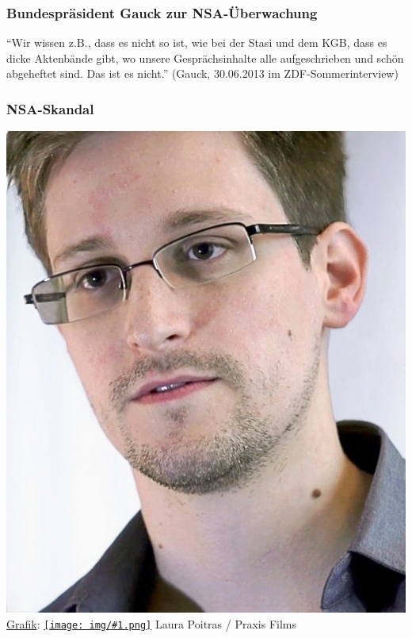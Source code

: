 \documentclass[12pt]{beamer}
\newcommand{\cc}[1]{\texttt{[image: img/\#1.png]}\hspace{1mm}}
\begin{document}
\begin{frame}
    \frametitle{Bundespräsident Gauck zur NSA-Überwachung}
    \begin{center}
      ``Wir wissen z.B., dass es nicht so ist, wie bei der Stasi und dem KGB, dass es dicke Aktenbände gibt, wo unsere Gesprächsinhalte alle aufgeschrieben und schön abgeheftet sind. Das ist es nicht.''
      (Gauck, 30.06.2013 im ZDF-Sommerinterview)
    \end{center}
\end{frame}

\begin{frame}
    \frametitle{NSA-Skandal}
    \begin{center}
	\includegraphics[height=0.7\textheight]{img/snowden.jpg}
	\\{\small \href{https://commons.wikimedia.org/wiki/File:Edward_Snowden.jpg\#mediaviewer/File:Edward_Snowden-2.jpg}{Grafik}: \href{https://creativecommons.org/licenses/by/3.0/}{\cc{by}} Laura Poitras / Praxis Films}
    \end{center}	
\end{frame}
\end{document}
